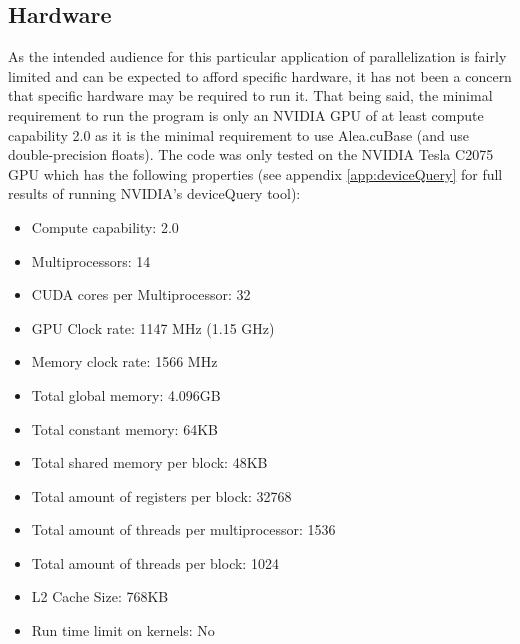 \subsection{Hardware}
As the intended audience for this particular application of parallelization is fairly limited and can be expected to afford specific hardware, it has not been a concern that specific hardware may be required to run it.
That being said, the minimal requirement to run the program is only an NVIDIA GPU of at least compute capability 2.0 as it is the minimal requirement to use Alea.cuBase (and use double-precision floats).
The code was only tested on the NVIDIA Tesla C2075 GPU which has the following properties (see appendix \ref{app:deviceQuery} for full results of running NVIDIA's deviceQuery tool):

\begin{itemize}
\item Compute capability: 2.0
\item Multiprocessors: 14
\item CUDA cores per Multiprocessor: 32
\item GPU Clock rate: 1147 MHz (1.15 GHz)
\item Memory clock rate: 1566 MHz
\item Total global memory: 4.096GB
\item Total constant memory: 64KB
\item Total shared memory per block: 48KB
\item Total amount of registers per block: 32768
\item Total amount of threads per multiprocessor: 1536
\item Total amount of threads per block: 1024
\item L2 Cache Size: 768KB
\item Run time limit on kernels: No
\end{itemize}